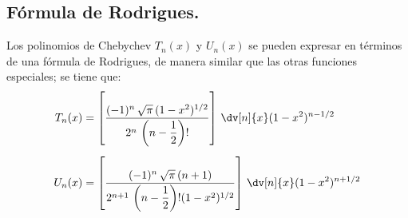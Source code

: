 \subsection{Fórmula de Rodrigues.}
Los polinomios de Chebychev $T_{n}(x)$ y $U_{n}(x)$ se pueden expresar en términos de una fórmula de Rodrigues, de manera similar que las otras funciones especiales; se tiene que:
\begin{align*}
T_{n}(x) &= \left[ \dfrac{(-1)^{n} \, \sqrt{\pi} \, (1 - x^{2})^{1/2}}{2^{n} \, \left( n - \dfrac{1}{2} \right)!} \right] \, \dv[n]{x} (1 - x^{2})^{n-1/2} \\[0.5em]
U_{n}(x) &= \left[ \dfrac{(-1)^{n} \, \sqrt{\pi} \, (n+1)}{2^{n+1} \, \left( n - \dfrac{1}{2} \right)! (1 - x^{2})^{1/2}} \right] \, \dv[n]{x} (1 - x^{2})^{n+1/2}
\end{align*}

